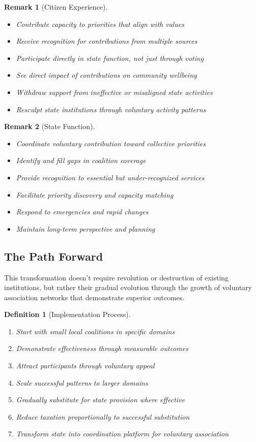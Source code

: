 \documentclass[11pt]{article}
\newtheorem{definition}{Definition}
\newtheorem{remark}{Remark}
\begin{document}
\begin{remark}[Citizen Experience]
\begin{itemize}
\item Contribute capacity to priorities that align with values
\item Receive recognition for contributions from multiple sources
\item Participate directly in state function, not just through voting
\item See direct impact of contributions on community wellbeing
\item Withdraw support from ineffective or misaligned state activities
\item Resculpt state institutions through voluntary activity patterns
\end{itemize}
\end{remark}

\begin{remark}[State Function]
\begin{itemize}
\item Coordinate voluntary contribution toward collective priorities
\item Identify and fill gaps in coalition coverage
\item Provide recognition to essential but under-recognized services
\item Facilitate priority discovery and capacity matching
\item Respond to emergencies and rapid changes
\item Maintain long-term perspective and planning
\end{itemize}
\end{remark}

\subsection{The Path Forward}

This transformation doesn't require revolution or destruction of existing institutions, but rather their gradual evolution through the growth of voluntary association networks that demonstrate superior outcomes.

\begin{definition}[Implementation Process]
\begin{enumerate}
\item Start with small local coalitions in specific domains
\item Demonstrate effectiveness through measurable outcomes
\item Attract participants through voluntary appeal
\item Scale successful patterns to larger domains
\item Gradually substitute for state provision where effective
\item Reduce taxation proportionally to successful substitution
\item Transform state into coordination platform for voluntary association
\end{enumerate}
\end{definition}
\end{document}
